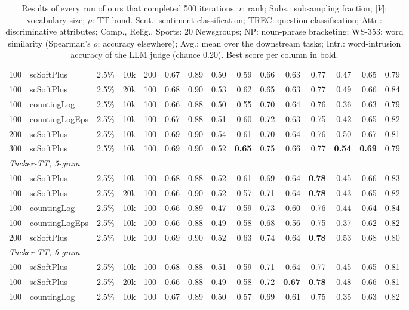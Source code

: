 \begin{table}[t]
\begin{tabular}{rlrrrrrrrrrrrrr}
    100 & scSoftPlus & 2.5\% & 10k & 200 & 0.67 & 0.89 & 0.50 & 0.59 & 0.66 & 0.63 & 0.77 & 0.47 & 0.65 & 0.79 \\
    100 & scSoftPlus & 2.5\% & 20k & 100 & 0.68 & 0.90 & 0.53 & 0.62 & 0.65 & 0.63 & 0.77 & 0.49 & 0.66 & 0.84 \\
    100 & countingLog & 2.5\% & 10k & 100 & 0.66 & 0.88 & 0.50 & 0.55 & 0.70 & 0.64 & 0.76 & 0.36 & 0.63 & 0.79 \\
    100 & countingLogEps & 2.5\% & 10k & 100 & 0.67 & 0.88 & 0.51 & 0.60 & 0.72 & 0.63 & 0.75 & 0.42 & 0.65 & 0.82 \\
    200 & scSoftPlus & 2.5\% & 10k & 100 & 0.69 & 0.90 & 0.54 & 0.61 & 0.70 & 0.64 & 0.76 & 0.50 & 0.67 & 0.81 \\
    300 & scSoftPlus & 2.5\% & 10k & 100 & 0.69 & 0.90 & 0.52 & \textbf{0.65} & 0.75 & 0.66 & 0.77 & \textbf{0.54} & \textbf{0.69} & 0.79 \\
    \midrule
    \multicolumn{15}{l}{\textit{Tucker-TT, 5-gram}} \\
    100 & scSoftPlus & 2.5\% & 10k & 100 & 0.68 & 0.88 & 0.52 & 0.61 & 0.69 & 0.64 & \textbf{0.78} & 0.45 & 0.66 & 0.83 \\
    100 & scSoftPlus & 2.5\% & 20k & 100 & 0.66 & 0.90 & 0.52 & 0.57 & 0.71 & 0.64 & \textbf{0.78} & 0.43 & 0.65 & 0.82 \\
    100 & countingLog & 2.5\% & 10k & 100 & 0.66 & 0.89 & 0.47 & 0.59 & 0.73 & 0.60 & 0.76 & 0.44 & 0.64 & 0.84 \\
    100 & countingLogEps & 2.5\% & 10k & 100 & 0.66 & 0.88 & 0.49 & 0.58 & 0.68 & 0.56 & 0.75 & 0.37 & 0.62 & 0.82 \\
    200 & scSoftPlus & 2.5\% & 10k & 100 & 0.69 & 0.90 & 0.52 & 0.63 & 0.74 & 0.64 & \textbf{0.78} & 0.53 & 0.68 & 0.80 \\
    \midrule
    \multicolumn{15}{l}{\textit{Tucker-TT, 6-gram}} \\
    100 & scSoftPlus & 2.5\% & 10k & 100 & 0.68 & 0.88 & 0.51 & 0.59 & 0.71 & 0.64 & 0.77 & 0.45 & 0.65 & 0.81 \\
    100 & scSoftPlus & 2.5\% & 20k & 100 & 0.66 & 0.88 & 0.49 & 0.58 & 0.72 & \textbf{0.67} & \textbf{0.78} & 0.48 & 0.66 & 0.81 \\
    100 & countingLog & 2.5\% & 10k & 100 & 0.67 & 0.89 & 0.50 & 0.57 & 0.69 & 0.61 & 0.75 & 0.35 & 0.63 & 0.82 \\
    \bottomrule
  \end{tabular}
  \caption{Results of every run of ours that completed 500 iterations. $r$: rank; Subs.: subsampling fraction; $|V|$: vocabulary size; $\rho$: TT bond. Sent.: sentiment classification; TREC: question classification; Attr.: discriminative attributes; Comp., Relig., Sports: 20 Newsgroups; NP: noun-phrase bracketing; WS-353: word similarity (Spearman's $\rho$; accuracy elsewhere); Avg.: mean over the downstream tasks; Intr.: word-intrusion accuracy of the LLM judge (chance 0.20). Best score per column in bold.}
  \label{tab:all-runs}
\end{table}
